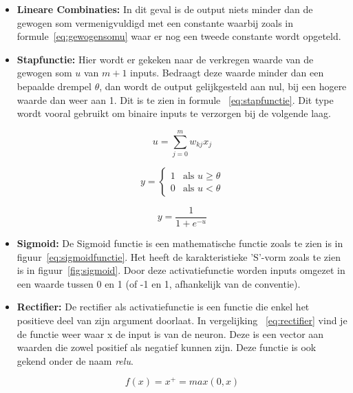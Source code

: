 			\begin{itemize}
				\item \textbf{Lineare Combinaties:} In dit geval is de output niets minder dan de gewogen som vermenigvuldigd met een constante waarbij zoals in formule~\ref{eq:gewogensomu} waar er nog een tweede constante wordt opgeteld.
				\item \textbf{Stapfunctie:} Hier wordt er gekeken naar de verkregen waarde van de gewogen som $u$ van $m+1$ inputs. Bedraagt deze waarde minder dan een bepaalde drempel $\theta$, dan wordt de output gelijkgesteld aan nul, bij een hogere waarde dan weer aan 1. Dit is te zien in formule ~\ref{eq:stapfunctie}. Dit type wordt vooral gebruikt om binaire inputs te verzorgen bij de volgende laag. 
			
				\begin{equation}\label{eq:gewogensomu}
					u =  \sum_{j=0}^{m}w_{kj}x_j
				\end{equation}
				
				\begin{equation}\label{eq:stapfunctie}
					y={\begin{cases}1&{\text{als }}u\geq \theta
					\\0&{\text{als }}u<\theta \end{cases}}
				\end{equation}
				
				\begin{equation}\label{eq:sigmoidfunctie}
					y={\frac {1}{1+e^{-u}}}
				\end{equation}
				
				\item \textbf{Sigmoid:} De Sigmoid functie\cite{han1995influence} is een mathematische functie zoals te zien is in figuur~\ref{eq:sigmoidfunctie}. Het heeft de karakteristieke 'S'-vorm zoals te zien is in figuur~\ref{fig:sigmoid}. Door deze activatiefunctie worden inputs omgezet in een waarde tussen 0 en 1 (of -1 en 1, afhankelijk van de conventie).
				\item \textbf{Rectifier:} De rectifier als activatiefunctie\cite{nair2010rectified} is een functie die enkel het positieve deel van zijn argument doorlaat. In vergelijking ~\ref{eq:rectifier} vind je de functie weer waar x de input is van de neuron. Deze is een vector aan waarden die zowel positief als negatief kunnen zijn. Deze functie is ook gekend onder de naam \textit{\gls{relu}}.
			
				\begin{equation}\label{eq:rectifier}
					f(x) = x^+ = max(0,x)
				\end{equation}
		
			\end{itemize}
			
